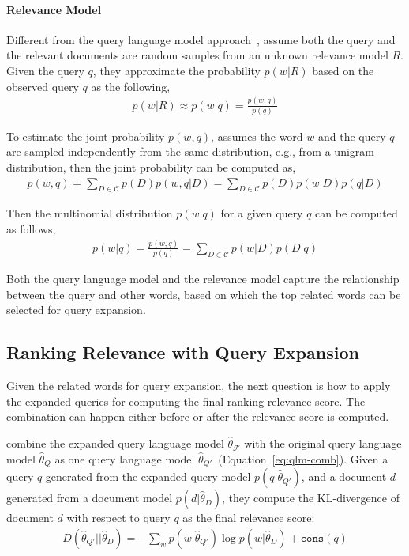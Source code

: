 \paragraph{Relevance Model}

Different from the query language model approach~\citep{zhai-01b}, \cite{Lavrenko-2001} assume both the query and the relevant documents are random samples from an unknown relevance model $R$. Given the query $q$, they approximate the probability $p(w|R)$ based on the observed query $q$ as the following,
\begin{align}
p(w|R) \approx p(w|q) = \frac{p(w,q)}{p(q)}
\end{align}

To estimate the joint probability $p(w,q)$, \cite{Lavrenko-2001} assumes the word $w$ and the query $q$ are sampled independently from the same distribution, e.g., from a unigram distribution, then the joint probability can be computed as,
\begin{align}
p(w, q) = \sum_{D \in \mathcal{C}} p(D) p(w,q | D) = \sum_{D \in \mathcal{C}} p(D) p(w|D) p(q | D)
\end{align}

Then the multinomial distribution $p(w|q)$ for a given query $q$ can be computed as follows,
\begin{align}
\label{eq:rm_qe}
p(w|q) = \frac{p(w, q)}{p(q)} = \sum_{D \in \mathcal{C}} p(w|D) p(D|q)
\end{align}

Both the query language model and the relevance model capture the relationship between the query and other words, based on which the top related words can be selected for query expansion.

\subsection{Ranking Relevance with Query Expansion}

Given the related words for query expansion, the next question is how to apply the expanded queries for computing the final ranking relevance score. The combination can happen either before or after the relevance score is computed.

\cite{zhai-01b} combine the expanded query language model $\hat{\theta}_{\mathcal{F}}$ with the original query language model $\hat{\theta}_{Q}$ as one query language model $\hat{\theta}_{Q'} $~(Equation~\ref{eq:qlm-comb}). Given a query $q$ generated from the expanded query model $p(q|\hat{\theta}_{Q'})$, and a document $d$ generated from a document model $p(d|\hat{\theta}_D)$, they compute the KL-divergence of document $d$ with respect to query $q$ as the final relevance score:
\begin{align}
D(\hat{\theta}_{Q'} || \hat{\theta}_D) = -\sum_w p(w|\hat{\theta}_{Q'}) \log p(w | \hat{\theta}_D) + \texttt{cons}(q)
\end{align}

